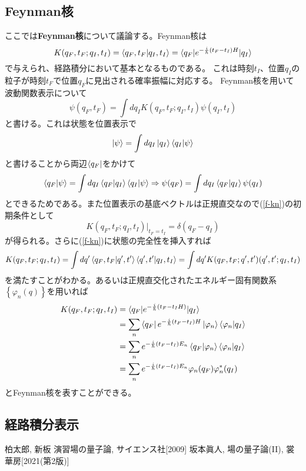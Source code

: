\documentclass[10pt]{jsarticle}
\newcommand{\nkakko}[1]{\left\{ #1 \right\}} %
\numberwithin{equation}{section}%
\begin{document}
\subsection{Feynman核}
ここでは{\bf Feynman核}について議論する。Feynman核は
\begin{equation}
 \label{f-kn} K(q_{F},t_{F};q_{I},t_{I})=\braket{q_{F},t_{F}|q_{I},t_{I}}=\braket{q_{F}|e^{-\frac{i}{\hbar}(t_{F}-t_{I})H}|q_{I}}
\end{equation}
で与えられ、経路積分において基本となるものである。
これは時刻$t_{I}$、位置$q_{I}$の粒子が時刻$t_{F}$で位置$q_{F}$に見出される確率振幅に対応する。
Feynman核を用いて波動関数表示について
\begin{equation}
  \psi(q_{F},t_{F})=\int dq_{I}K(q_{F},t_{F};q_{I},t_{I})\psi(q_{I},t_{I})
\end{equation}
と書ける。これは状態を位置表示で
\begin{equation}
  \ket{\psi}=\int dq_{I}\ket{q_{I}}\braket{q_{I}|\psi}
\end{equation}
と書けることから両辺$\bra{q_{F}}$をかけて
\begin{equation}
  \braket{q_{F}|\psi}=\int dq_{I}\braket{q_{F}|q_{I}}\braket{q_{I}|\psi}\Rightarrow \psi(q_{F}) =\int dq_{I}\braket{q_{F}|q_{I}}\psi(q_{I})
\end{equation}
とできるためである。また位置表示の基底ベクトルは正規直交なので(\ref{f-kn})の初期条件として
\begin{equation}
  K(q_{F},t_{F};q_{I},t_{I})|_{t_{F}=t_{I}}=\delta (q_{F}-q_{I})
\end{equation}
が得られる。さらに(\ref{f-kn})に状態の完全性を挿入すれば
\begin{equation}
  K(q_{F},t_{F};q_{I},t_{I})=\int dq' \braket{q_{F},t_{F}|q',t'} \braket{q',t'|q_{I},t_{I}}=\int dq' K(q_{F},t_{F};q',t')(q',t';q_{I},t_{I})
\end{equation}
を満たすことがわかる。あるいは正規直交化されたエネルギー固有関数系$\nkakko{\varphi_{n}(q)}$を用いれば
\begin{align}
  K(q_{F},t_{F};q_{I},t_{I})&=\braket{q_{F}|e^{-\frac{i}{\hbar}(t_{F}-t_{I}H)}|q_{I}}\\
  &=\sum_{n}\bra{q_{F}}e^{-\frac{i}{\hbar}(t_{F}-t_{I})H}\ket{\varphi_{n}} \braket{\varphi_{n}|q_{I}}\\
&=\sum_{n}e^{-\frac{i}{\hbar}(t_{F}-t_{I})E_{n}}\braket{q_{F}|\varphi_{n}} \braket{\varphi_{n}|q_{I}}\\
&=\sum_{n}e^{-\frac{i}{\hbar}(t_{F}-t_{I})E_{n}}\varphi_{n}(q_{F})\varphi_{n}^{*}(q_{I})
\end{align}
とFeynman核を表すことができる。
\subsection{経路積分表示}
\begin{thebibliography}{99}
   柏太郎, 新板 演習場の量子論, サイエンス社[2009]   
   坂本眞人, 場の量子論(II), 裳華房[2021(第2版)]   
\end{thebibliography}
\end{document}
